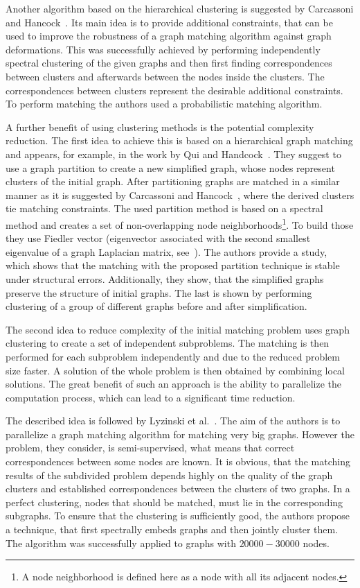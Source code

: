 Another algorithm based on the hierarchical clustering is suggested by Carcassoni and Hancock~\cite{Hancock_ModalClusters}. Its main idea is to provide additional constraints, that can be used to improve the robustness of a graph matching algorithm against graph deformations. This was successfully achieved by performing independently spectral clustering of the given graphs and then first finding correspondences between clusters and afterwards between the nodes inside the clusters. The correspondences between clusters represent the desirable additional constraints. To perform matching the authors used a probabilistic matching algorithm.

A further benefit of using clustering methods is the potential complexity reduction. 
The first idea to achieve this is based on a hierarchical graph matching and appears, for example, in the work by Qui and Handcock~\cite{Hancock_GM_SpectralPart}. They suggest to use a graph partition to create a new simplified graph, whose nodes represent clusters of the initial graph. After partitioning graphs are matched in a similar manner as it is suggested by Carcassoni and Hancock~\cite{Hancock_ModalClusters}, where the derived clusters tie matching constraints. The used partition method is based on a spectral method and creates a set of non-overlapping node neighborhoods\footnote{A node neighborhood is defined here as a node with all its adjacent nodes.}. To build those they use Fiedler vector (eigenvector associated with the second smallest eigenvalue of a graph Laplacian matrix, see~\cite{Fiedler1975}). The authors provide a study, which shows that the matching with the proposed partition technique is stable under structural errors. Additionally, they show, that the simplified graphs preserve the structure of initial graphs. The last is shown by performing clustering of a group of different graphs before and after simplification.

The second idea to reduce complexity of the initial matching problem uses graph clustering to create a set of independent subproblems. The matching is then performed for each subproblem independently and due to the reduced problem size faster. A solution of the whole problem is then obtained by combining local solutions. The great benefit of such an approach is the ability to parallelize the computation process, which can lead to a significant time reduction.

The described idea is followed by Lyzinski et al.~\cite{Lyzinski2015}. The aim of the authors is to parallelize a graph matching algorithm for matching very big graphs. However the problem, they consider, is semi-supervised, what means that correct correspondences between some nodes are known. It is obvious, that the matching results of the subdivided problem depends highly on the quality of the graph clusters and established correspondences between the clusters of two graphs. In a perfect clustering, nodes that should be matched, must lie in the corresponding subgraphs. To ensure that the clustering is sufficiently good, the authors propose a technique, that first spectrally embeds graphs and then jointly cluster them. The algorithm was successfully applied to graphs with $20000-30000$ nodes.

